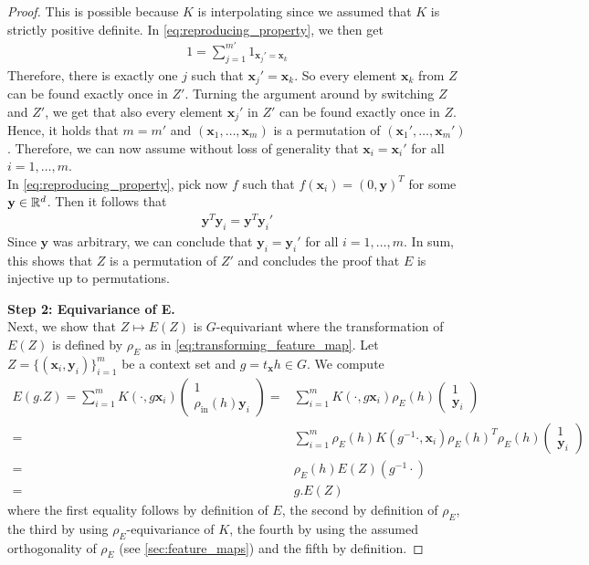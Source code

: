 \begin{proof}
	This is possible because $K$ is interpolating since we assumed that $K$ is strictly positive definite.
	In \cref{eq:reproducing_property}, we then get \begin{align} 1=\sum\limits_{j=1}^{m'}1_{\mathbf{x}_j'=\mathbf{x}_k} \end{align} Therefore, there is exactly one $j$ such that $\mathbf{x}_j'=\mathbf{x}_k$.
	So every element $\mathbf{x}_k$ from $Z$ can be found exactly once in $Z'$.
	Turning the argument around by switching $Z$ and $Z'$, we get that also every element $\mathbf{x}_j'$ in $Z'$ can be found exactly once in $Z$.
	Hence, it holds that $m=m'$ and $(\mathbf{x}_1,\dots,\mathbf{x}_m)$ is a permutation of $(\mathbf{x}_1',\dots,\mathbf{x}_{m}')$.
	Therefore, we can now assume without loss of generality that $\mathbf{x}_i=\mathbf{x}_i'$ for all $i=1,\dots,m$.
	\\
	In \cref{eq:reproducing_property}, pick now $f$ such that $f(\mathbf{x}_i)=(0,\mathbf{y})^T$ for some $\mathbf{y}\in\mathbb{R}^d$.
	Then it follows that \begin{align} \mathbf{y}^T\mathbf{y}_i=\mathbf{y}^T\mathbf{y}_i' \end{align} Since $\mathbf{y}$ was arbitrary, we can conclude that $\mathbf{y}_i=\mathbf{y}_i'$ for all $i=1,\dots,m$.
	In sum, this shows that $Z$ is a permutation of $Z'$ and concludes the proof that $E$ is injective up to permutations.

	\textbf{Step 2: Equivariance of E.}\\
	Next, we show that $Z\mapsto E(Z)$ is $G$-equivariant where the transformation of $E(Z)$ is defined by $\rho_E$ as in   \cref{eq:transforming_feature_map}.
	Let $Z=\{(\mathbf{x}_i,\mathbf{y}_i)\}_{i=1}^{m}$ be a context set and $g=t_{\mathbf{x}}h\in G$.
	We compute \begin{align} E(g.Z)=\sum\limits_{i=1}^{m}K(\cdot,g\mathbf{x}_i)\begin{pmatrix} 1 \\ \rho_{\text{in}}(h)\mathbf{y}_i \end{pmatrix} =&\sum\limits_{i=1}^{m}K(\cdot,g\mathbf{x}_i)\rho_{E}(h)\begin{pmatrix} 1 \\ \mathbf{y}_i \end{pmatrix}\\ =&\sum\limits_{i=1}^{m}\rho_{E}(h)K(g^{-1}\cdot,\mathbf{x}_i)\rho_{E}(h)^T\rho_{E}(h)\begin{pmatrix} 1 \\ \mathbf{y}_i \end{pmatrix}\\ =&\rho_E(h)E(Z)(g^{-1}\cdot)\\ =&g.E(Z) \end{align} where the first equality follows by definition of $E$, the second by definition of $\rho_E$, the third by using $\rho_E$-equivariance of $K$, the fourth by using the assumed orthogonality of $\rho_E$ (see \cref{sec:feature_maps}) and the fifth by definition.


\end{proof}
